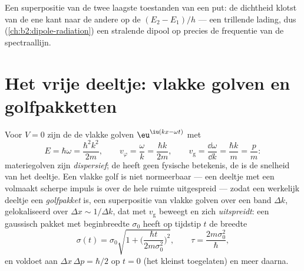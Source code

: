 \begin{omfigure}

{\small Een superpositie van de twee laagste toestanden van een put: de
dichtheid klotst van de ene kant naar de andere op de 
$(E_2 - E_1)/h$ --- een trillende lading, dus (\cref{ch:b2:dipole-radiation})
een stralende dipool op precies de frequentie van de spectraallijn.}
\end{omfigure}

\section{Het vrije deeltje: vlakke golven en golfpakketten}

\begin{proposition}\label{prop:b2:schrodinger-wave-functions:free}
Voor $V = 0$ zijn de  de vlakke golven
$\eu^{\iu(kx -
\omega t)}$ met
\[
E = \hbar\omega = \frac{\hbar^2k^2}{2m}, \qquad
v_\varphi = \frac{\omega}{k} = \frac{\hbar k}{2m}, \qquad
v_{\text{g}} = \frac{\dd\omega}{\dd k} = \frac{\hbar k}{m} = \frac{p}{m} :
\]
materiegolven zijn \emph{dispersief}; de  heeft geen fysische
betekenis, de \emph{} is de snelheid van het deeltje. Een vlakke
golf is niet normeerbaar --- een deeltje met een volmaakt scherpe impuls
is over de hele ruimte uitgespreid --- zodat een werkelijk deeltje een
\emph{golfpakket} is, een superpositie van vlakke golven
over een band
$\Delta k$, gelokaliseerd over $\Delta x \sim 1/\Delta k$, dat met
$v_{\text{g}}$ beweegt en
zich \emph{uitspreidt}: een gaussisch pakket met beginbreedte $\sigma_0$ heeft op
tijdstip $t$ de breedte
\[
\sigma(t) = \sigma_0\sqrt{1 + \Big(\frac{\hbar t}{2m\sigma_0^2}\Big)^2}, \qquad
\tau = \frac{2m\sigma_0^2}{\hbar} ,
\]
en voldoet aan $\Delta x\,\Delta p = \hbar/2$ op $t = 0$ (het kleinst toegelaten)
en meer daarna.
\end{proposition}

